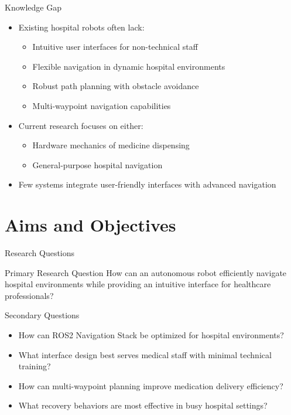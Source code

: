 \documentclass[aspectratio=169]{beamer}
\newcommand{\reducefontsize}{\fontsize{7}{9}\selectfont}
\begin{document}
\begin{frame}{Knowledge Gap}
	\begin{itemize}
		\item Existing hospital robots often lack:
		      \begin{itemize}
			      \item Intuitive user interfaces for non-technical staff
			      \item Flexible navigation in dynamic hospital environments
			      \item Robust path planning with obstacle avoidance
			      \item Multi-waypoint navigation capabilities
		      \end{itemize}
		\item Current research focuses on either:
		      \begin{itemize}
			      \item Hardware mechanics of medicine dispensing
			      \item General-purpose hospital navigation
		      \end{itemize}
		\item Few systems integrate user-friendly interfaces with advanced navigation
	\end{itemize}
\end{frame}

\section{Aims and Objectives}

\begin{frame}{Research Questions}
	\begin{alertblock}{Primary Research Question}
		How can an autonomous robot efficiently navigate hospital environments while providing an intuitive interface for healthcare professionals?
	\end{alertblock}
	{\reducefontsize%
	\begin{block}{Secondary Questions}
		\begin{itemize}
			\item How can ROS2 Navigation Stack be optimized for hospital environments?
			\item What interface design best serves medical staff with minimal technical training?
			\item How can multi-waypoint planning improve medication delivery efficiency?
			\item What recovery behaviors are most effective in busy hospital settings?
		\end{itemize}
	\end{block}
	}
\end{frame}
\end{document}
